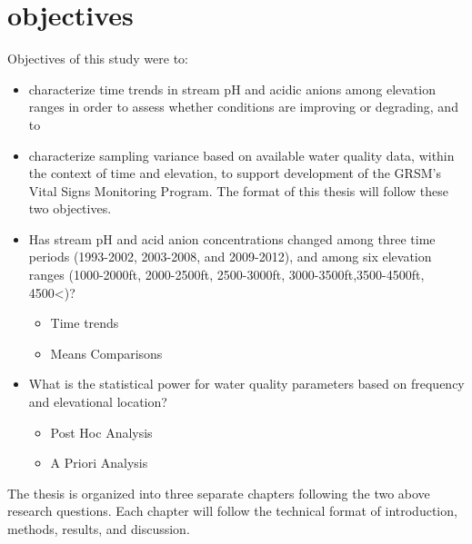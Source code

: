 \section{objectives}
Objectives of this study were to:
\begin{itemize}
\item  characterize time trends in stream pH and acidic anions among elevation ranges in order to assess whether conditions are improving or degrading, and to
\item characterize sampling variance based on available water quality data, within the context of time and elevation, to support development of the GRSM’s Vital Signs Monitoring Program.  The format of this thesis will follow these two objectives.  
\end{itemize}
\begin{itemize}
\item Has stream pH and acid anion concentrations changed among three time periods (1993-2002, 2003-2008, and 2009-2012), and among six elevation ranges (1000-2000ft, 2000-2500ft, 2500-3000ft, 3000-3500ft,3500-4500ft, 4500<)?
\begin{itemize}
\item Time trends
 \item Means Comparisons
\end{itemize}
\item What is the statistical power for water quality parameters based on frequency and elevational location?
\begin{itemize}
\item Post Hoc Analysis
\item A Priori Analysis
\end{itemize}
\end{itemize}
The thesis is organized into three separate chapters following the two above research questions. Each chapter will follow the technical format of introduction, methods, results, and discussion. 







 